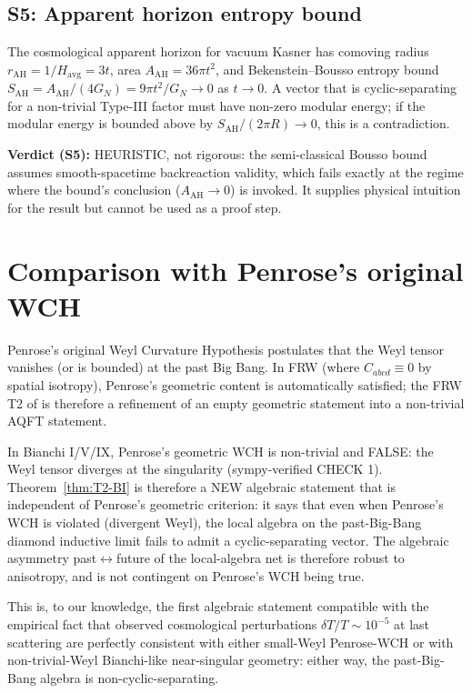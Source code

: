 \documentclass[11pt,a4paper]{article}
\theoremstyle{definition}
\begin{document}
\subsection*{S5: Apparent horizon entropy bound}

The cosmological apparent horizon for vacuum Kasner has comoving radius
$r_\mathrm{AH}=1/H_\mathrm{avg}=3t$, area $A_\mathrm{AH}=36\pi t^2$, and
Bekenstein--Bousso entropy bound $S_\mathrm{AH}=A_\mathrm{AH}/(4G_N) =
9\pi t^2/G_N \to 0$ as $t\to 0$. A vector that is cyclic-separating for
a non-trivial Type-III factor must have non-zero modular energy; if the
modular energy is bounded above by $S_\mathrm{AH}/(2\pi R)\to 0$, this
is a contradiction.

\textbf{Verdict (S5):} HEURISTIC, not rigorous: the semi-classical
Bousso bound assumes smooth-spacetime backreaction validity, which fails
exactly at the regime where the bound's conclusion ($A_\mathrm{AH}\to 0$)
is invoked. It supplies physical intuition for the result but cannot be
used as a proof step.

\section{Comparison with Penrose's original WCH}

Penrose's original Weyl Curvature Hypothesis \cite{Penrose1979,Penrose2010}
postulates that the Weyl tensor vanishes (or is bounded) at the past Big
Bang. In FRW (where $C_{abcd}\equiv 0$ by spatial isotropy), Penrose's
geometric content is automatically satisfied; the FRW T2 of
\cite{Remondiere2026FRW} is therefore a refinement of an empty
geometric statement into a non-trivial AQFT statement.

In Bianchi I/V/IX, Penrose's geometric WCH is non-trivial and FALSE: the
Weyl tensor diverges at the singularity (sympy-verified
\cite{RemondiereOpus2026Bianchi} CHECK 1). Theorem~\ref{thm:T2-BI} is
therefore a NEW algebraic statement that is independent of Penrose's
geometric criterion: it says that even when Penrose's WCH is violated
(divergent Weyl), the local algebra on the past-Big-Bang diamond
inductive limit fails to admit a cyclic-separating vector. The
algebraic asymmetry past$\leftrightarrow$future of the local-algebra
net is therefore robust to anisotropy, and is not contingent on
Penrose's WCH being true.

This is, to our knowledge, the first algebraic statement compatible
with the empirical fact that observed cosmological perturbations
$\delta T/T\sim 10^{-5}$ at last scattering are perfectly consistent with
either small-Weyl Penrose-WCH or with non-trivial-Weyl Bianchi-like
near-singular geometry: either way, the past-Big-Bang algebra is
non-cyclic-separating.
\end{document}
